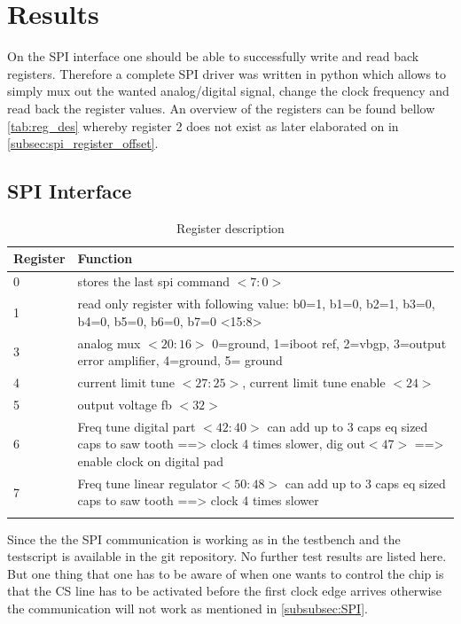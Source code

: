 \section{Results}
\label{sec:results}
On the SPI interface one should be able to successfully write and read back registers. Therefore a complete SPI driver was written in python which allows to simply mux out the wanted analog/digital signal, change the clock frequency and read back the register values. An overview of the registers can be found bellow \autoref{tab:reg_des} whereby register 2 does not exist as later elaborated on in \autoref{subsec:spi_register_offset}.
\subsection{SPI Interface}
\label{subsec:spi_interface}
\begin{longtable}{|p{1.5cm}|p{10.5cm}|}
	\hline
	\rowcolor{lightgray}
	\textbf{Register} &\textbf{Function} \\ \hline
	0 & stores the last spi command $<7:0>$\\ \hline
    1 & read only register with following value: b0=1, b1=0, b2=1, b3=0, b4=0, b5=0, b6=0, b7=0 <15:8> \\ \hline
    3 & analog mux $<20:16>$ 0=ground, 1=iboot ref, 2=vbgp, 3=output error amplifier, 4=ground,  5= ground \\ \hline
	4 & current limit tune $<27:25>$, current limit tune enable $<24>$ \\ \hline
	5 & output voltage fb $<32>$ \\ \hline
	6 & Freq tune digital part $<42:40>$ can add up to 3 caps eq sized caps to saw tooth ==> clock 4 times slower, dig out$<47>$ ==> enable clock on digital pad\\ \hline
    7 & Freq tune linear regulator$<50:48>$ can add up to 3 caps eq sized caps to saw tooth ==> clock 4 times slower \\ \hline
	\caption{Register description} %
	\label{tab:reg_des}
\end{longtable}
Since the the SPI communication is working as in the testbench and the testscript is available in the git repository. No further test results are listed here. But one thing that one has to be aware of when one wants to control the chip is that the CS line has to be activated before the first clock edge arrives otherwise the communication will not work as mentioned in \autoref{subsubsec:SPI}.

